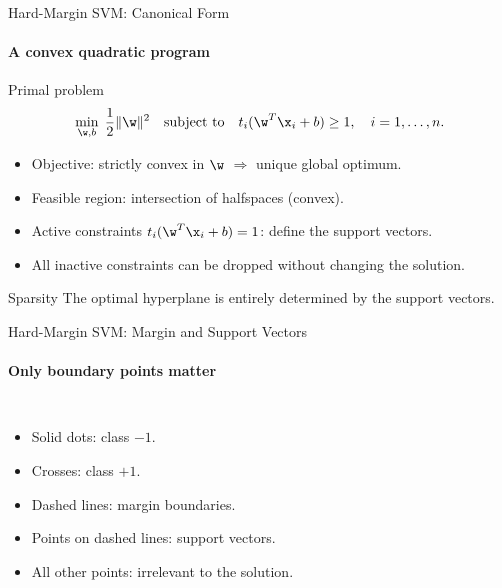 \begin{frame}{Hard-Margin SVM: Canonical Form}
  \framesubtitle{A convex quadratic program}
  \begin{block}{Primal problem}
    \[
      \min_{\w,b} \;\frac{1}{2}\|\w\|^2
      \quad\text{subject to}\quad
      t_i(\w^T\x_i + b) \ge 1, \quad i=1,\ldots,n.
    \]
  \end{block}
  \begin{itemize}
    \item Objective: \alert{strictly convex} in $\w$ $\Rightarrow$ unique global optimum.
    \item Feasible region: intersection of halfspaces (convex).
    \item Active constraints $t_i(\w^T\x_i+b) = 1$: define the \alert{support vectors}.
    \item All inactive constraints can be dropped without changing the solution.
  \end{itemize}
  \begin{alertblock}{Sparsity}
    The optimal hyperplane is entirely determined by the support vectors.
  \end{alertblock}
\end{frame}

\begin{frame}{Hard-Margin SVM: Margin and Support Vectors}
  \framesubtitle{Only boundary points matter}
  \begin{columns}
      \begin{itemize}
        \item Solid dots: class $-1$.
        \item Crosses: class $+1$.
        \item Dashed lines: margin boundaries.
        \item Points on dashed lines: \alert{support vectors}.
        \item All other points: irrelevant to the solution.
      \end{itemize}
  \end{columns}
\end{frame}

